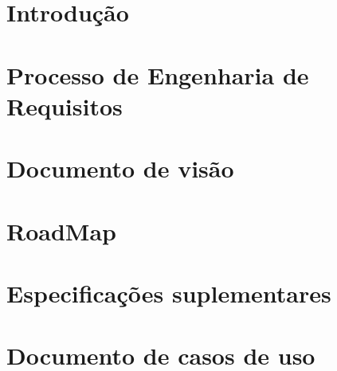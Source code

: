 
\section{Introdução} %
\label{sec:introdu_o}
 

\section{Processo de Engenharia de Requisitos}
\label{sec:processo}


\section{Documento de visão}
\label{sec:document_de_visao}


\section{RoadMap}
\label{sec:road_map}


\section{Especificações suplementares}
\label{sec:especificacoes_suplementares}


\section{Documento de casos de uso}
\label{sec:documento_de_caso_de_uso}

